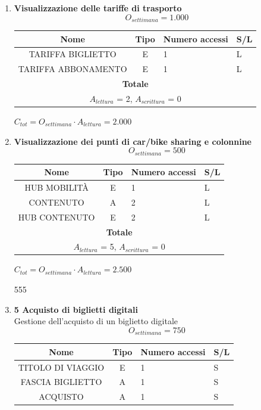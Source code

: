 \documentclass[12pt,a4paper]{report}
\begin{document}
\begin{enumerate}[label=\textbf{\arabic*)}]
    \item \textbf{Visualizzazione delle tariffe di trasporto} \\
    \[ {O_{settimana} = 1.000} \]
    \begin{table}[H]
    \centering
    \begin{tabular}{|c|c|l|l|}
    \hline
    \textbf{Nome} & \textbf{Tipo} & \textbf{Numero accessi} & \textbf{S/L} \\
    \hline
    TARIFFA BIGLIETTO & E & 1 & L \\
    \hline
    TARIFFA ABBONAMENTO & E & 1 & L \\
    \hline
    \multicolumn{4}{c}{\textbf{Totale}} \\    
    \multicolumn{4}{c}{${A_{lettura}}$ = 2, ${A_{scrittura}}$ = 0} \\
    \hline
    \end{tabular}
    \end{table}
    \begin{center}
    ${C_{tot} = {O_{settimana}}\cdot{A_{lettura}} = 2.000}$
    \end{center}

    \item \textbf{Visualizzazione dei punti di car/bike sharing e colonnine} \\
    \[ {O_{settimana} = 500} \]
    \begin{table}[H]
    \centering
    \begin{tabular}{|c|c|l|l|}
    \hline
    \textbf{Nome} & \textbf{Tipo} & \textbf{Numero accessi} & \textbf{S/L} \\
    \hline
    HUB MOBILITÀ & E & 1 & L \\
    \hline
    CONTENUTO & A & 2 & L \\
    \hline
    HUB CONTENUTO & E & 2 & L \\
    \hline
    \multicolumn{4}{c}{\textbf{Totale}} \\    
    \multicolumn{4}{c}{${A_{lettura}}$ = 5, ${A_{scrittura}}$ = 0} \\
    \hline
    \end{tabular}
    \end{table}
    \begin{center}
    ${C_{tot} = O_{settimana}\cdot{A_{lettura}} = 2.500}$
    \end{center}

555
    \item \textbf{5 Acquisto di biglietti digitali} \\
    Gestione dell'acquisto di un biglietto digitale
    \[ {O_{settimana} = 750} \]
    \begin{table}[H]
    \centering
    \begin{tabular}{|c|c|l|l|}
    \hline
    \textbf{Nome} & \textbf{Tipo} & \textbf{Numero accessi} & \textbf{S/L} \\
    \hline
    TITOLO DI VIAGGIO & E & 1 & S \\
    \hline
    FASCIA BIGLIETTO & A & 1 & S \\
    \hline
    ACQUISTO & A & 1 & S \\
    \hline
    

\end{tabular}
\end{table}
\end{enumerate}
\end{document}
